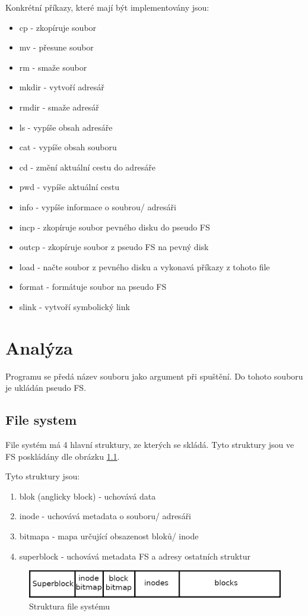 \documentclass[12pt]{report}
\begin{document}
Konkrétní příkazy, které mají být implementovány jsou:
\begin{itemize}
	\item cp - zkopíruje soubor
	\item mv - přesune soubor
	\item rm - smaže soubor
	\item mkdir - vytvoří adresář
	\item rmdir - smaže adresář
	\item ls - vypíše obsah adresáře
	\item cat - vypíše obsah souboru
	\item cd - změní aktuální cestu do adresáře
	\item pwd - vypíše aktuální cestu
	\item info - vypíše informace o soubrou/ adresáři
	\item incp - zkopíruje soubor pevného disku do pseudo FS
	\item outcp - zkopíruje soubor z pseudo FS na pevný disk
	\item load - načte soubor z pevného disku a vykonavá příkazy z tohoto file
	\item format - formátuje soubor na pseudo FS
	\item slink - vytvoří symbolický link
\end{itemize}
%
%
\chapter{Analýza}
Programu se předá název souboru jako argument při spuštění. Do tohoto souboru je ukládán pseudo FS.
\section{File system}
File systém má 4 hlavní struktury, ze kterých se skládá. Tyto struktury jsou ve FS poskládány dle
obrázku \ref{img:fs_structure}.

Tyto struktury jsou:
\begin{enumerate}
	\item blok (anglicky block) - uchovává data
	\item inode - uchovává metadata o souboru/ adresáři
	\item bitmapa - mapa určující obsazenost bloků/ inode
	\item superblock - uchovává metadata FS a adresy ostatních struktur
\end{enumerate}
%
\begin{figure}[H]
	\centering
	\includegraphics[width=\textwidth]{img/fs_structure.png}
	\caption{Struktura file systému}
	\label{img:fs_structure}
\end{figure}
%
\end{document}
